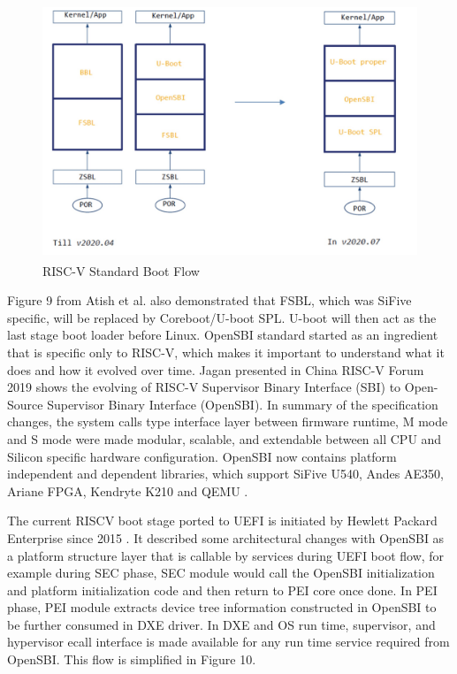 \documentclass[review]{elsarticle}
\begin{document}
\begin{figure}[H]
	\centering
	\includegraphics[width=1\textwidth,height=3in]{figs/RiscVStandardBootFlow.JPG}
	\caption{RISC-V Standard Boot Flow \cite{R51:1}}
\end{figure}

Figure 9 from Atish et al. also demonstrated that FSBL, which was SiFive specific, will be replaced by Coreboot/U-boot SPL. U-boot will then act as the last stage boot loader before Linux. OpenSBI standard started as an ingredient that is specific only to RISC-V, which makes it important to understand what it does and how it evolved over time. Jagan presented in China RISC-V Forum 2019 shows the evolving of RISC-V Supervisor Binary Interface (SBI) to Open-Source Supervisor Binary Interface (OpenSBI). In summary of the specification changes, the system calls type interface layer between firmware runtime, M mode and S mode were made modular, scalable, and extendable between all CPU and Silicon specific hardware configuration. OpenSBI now contains platform independent and dependent libraries, which support SiFive U540, Andes AE350, Ariane FPGA, Kendryte K210 and QEMU \cite{R51:1}.

The current RISCV boot stage ported to UEFI is initiated by Hewlett Packard Enterprise since 2015 \cite{R51:2}. It described some architectural changes with OpenSBI as a platform structure layer that is callable by services during UEFI boot flow, for example during SEC phase, SEC module would call the OpenSBI initialization and platform initialization code and then return to PEI core once done. In PEI phase, PEI module extracts device tree information constructed in OpenSBI to be further consumed in DXE driver. In DXE and OS run time, supervisor, and hypervisor ecall interface is made available for any run time service required from OpenSBI. This flow is simplified in Figure 10.
\end{document}
